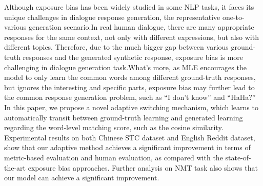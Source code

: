 Although exposure bias has been widely studied in some NLP tasks, it faces its unique challenges in dialogue response generation, the representative one-to-various generation scenario.In real human dialogue, there are many appropriate responses for the same context, not only with different expressions, but also with different topics. Therefore, due to the much bigger gap between various ground-truth responses and the generated synthetic response, exposure bias is more challenging in dialogue generation task.What's more, as MLE encourages the model to only learn the common words among different ground-truth responses, but ignores the interesting and specific parts,  exposure bias may further lead to the common response generation problem, such as ``I don't know'' and ``HaHa?'' In this paper, we propose a novel adaptive switching mechanism, which learns to automatically transit between ground-truth learning and generated learning regarding the word-level matching score, such as the cosine similarity. Experimental results on both Chinese STC dataset and English Reddit dataset, show that our adaptive method achieves a significant improvement in terms of metric-based evaluation and human evaluation, as compared with the state-of-the-art exposure bias approaches. Further analysis on NMT task also shows that our model can achieve a significant improvement.

